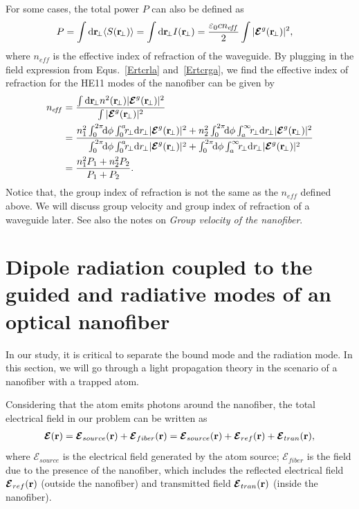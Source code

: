 For some cases, the total power $ P $ can also be defined as
\begin{align}
P &= \int \mathrm{d}\mathbf{r}\!_\perp \langle S(\mathbf{r}\!_\perp)\rangle =\int \mathrm{d} \mathbf{r}\!_\perp I(\mathbf{r}\!_\perp)=\frac{\varepsilon_0 c n_{e\!f\!f}}{2}\int |\boldsymbol{\mathcal{E}}^g(\mathbf{r}\!_\perp)|^2,
\end{align}
where $ n_{e\!f\!f} $ is the effective index of refraction of the waveguide. 
By plugging in the field expression from Equs.~\eqref{Ertcrla} and~\eqref{Ertcrga}, we find the effective index of refraction for the HE11 modes of the nanofiber can be given by
\begin{align}
n_{e\!f\!f} &=\frac{\int \mathrm{d}\br\!_\perp n^2(\br\!_\perp) |\boldsymbol{\mathcal{E}}^g(\br\!_\perp)|^2}{\int |\boldsymbol{\mathcal{E}}^g(\br\!_\perp)|^2}\\
&= \frac{n_1^2\int_0^{2\pi} \!\!\mathrm{d} \phi \int_0^a\!\!r\!_\perp\mathrm{d}r\!_\perp|\boldsymbol{\mathcal{E}}^g(\br\!_\perp)|^2 + n_2^2\int_0^{2\pi}\!\! \mathrm{d} \phi \int_a^\infty\!\!r\!_\perp \mathrm{d}r\!_\perp|\boldsymbol{\mathcal{E}}^g(\br\!_\perp)|^2}
{\int_0^{2\pi} \!\!\mathrm{d} \phi \int_0^a\!\!r\!_\perp\mathrm{d}r\!_\perp|\boldsymbol{\mathcal{E}}^g(\br\!_\perp)|^2 + \int_0^{2\pi}\!\! \mathrm{d} \phi \int_a^\infty\!\!r\!_\perp \mathrm{d}r\!_\perp|\boldsymbol{\mathcal{E}}^g(\br\!_\perp)|^2}\\
&= \frac{n_1^2P_1+n_2^2P_2}{P_1+P_2}.
\end{align}
Notice that, the group index of refraction is not the same as the $ n_{e\!f\!f} $ defined above. We will discuss group velocity and group index of refraction of a waveguide later. See also the notes on \textit{Group velocity of the nanofiber}. 


\section{Dipole radiation coupled to the guided and radiative modes of an optical nanofiber}\label{sec:boundrad}
In our study, it is critical to separate the bound mode and the radiation mode. In this section, we will 
go through a light propagation theory in the scenario of a nanofiber with a trapped atom. 

Considering that the atom emits photons around the nanofiber, the total electrical field in our problem 
can be written as 
\begin{align}\label{Esrt0}
\boldsymbol{\mathcal{E}}(\br) = \boldsymbol{\mathcal{E}}_{source}(\br) + 
\boldsymbol{\mathcal{E}}_{fiber}(\br)=\boldsymbol{\mathcal{E}}_{source}(\br) + 
\boldsymbol{\mathcal{E}}_{ref}(\br) +\boldsymbol{\mathcal{E}}_{tran}(\br),
\end{align}
where $ \boldsymbol{\mathcal{E}}_{source} $ is the electrical field generated by the atom source;  $ 
\boldsymbol{\mathcal{E}}_{fiber} $ is the field due to the presence of the nanofiber, which includes the 
reflected electrical field $ \boldsymbol{\mathcal{E}}_{ref}(\mathbf{r}) $ (outside the nanofiber) and transmitted field $ 
\boldsymbol{\mathcal{E}}_{tran}(\mathbf{r}) $ (inside the nanofiber). 


